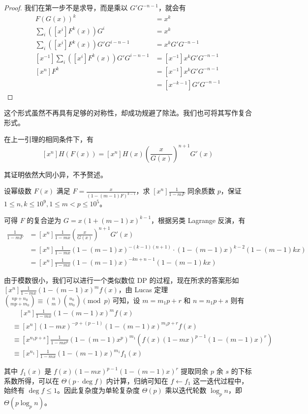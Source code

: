 \begin{proof} 我们在第一步不是求导，而是乘以 $G'G^{-n-1}$，就会有
\begin{align*}
F(G(x))^k &= x^k\\
\sum_i ([x^i]F^k(x))G^i &= x^k\\
\sum_i ([x^i]F^k(x))G'G^{i-n-1} &= x^k G'G^{-n-1}\\
[x^{-1}]\sum_i ([x^i]F^k(x))G'G^{i-n-1} &= [x^{-1}]x^k G'G^{-n-1}\\
[x^n]F^k &= [x^{-1}]x^k G'G^{-n-1}\\
&= [x^{-k-1}]G'G^{-n-1}
\end{align*}
\end{proof}

这个形式虽然不再具有足够的对称性，却成功规避了除法。我们也可将其写作复合形式。

\begin{lemma} 在上一引理的相同条件下，有
$$
[x^n] H(F(x)) = [x^n]H(x)\left(\frac{x}{G(x)}\right)^{n+1}G'(x)
$$
\end{lemma}

其证明依然大同小异，不予赘述。

\begin{problem}
设幂级数 $F(x)$ 满足 $F = \frac x{(1-(m-1)F)^{k-1}}$，求 $[x^n]\frac 1{1-mF}$ 同余质数 $p$，保证 $1\le n,k\le 10^9, 1\le m < p\le 10^5$。
\end{problem}

\begin{solution}
可得 $F$ 的复合逆为 $G=x(1+(m-1)x)^{k-1}$，根据另类 Lagrange 反演，有
\begin{align*}
[x^n] \frac 1{1-mF}
&= [x^n]\frac 1{1-mx}\left(\frac{x}{G(x)}\right)^{n+1}G'(x)\\
&= [x^n]\frac 1{1-mx}(1-(m-1)x)^{-(k-1)(n+1)} \cdot (1-(m-1)x)^{k-2}(1-(m-1)kx)\\
&= [x^n]\frac 1{1-mx}(1-(m-1)x)^{-kn+n-1}(1-(m-1)kx)
\end{align*}

由于模数很小，我们可以进行一个类似数位 DP 的过程，现在所求的答案形如 $[x^n] \frac 1{1-mx}(1-(m-1)x)^mf(x)$，由 Lucas 定理 $\binom {np+n_0}{mp+m_0} \equiv \binom n m\binom{n_0}{m_0} \pmod p$ 可知，设 $m=m_1p+r$ 和 $n=n_1p+s$ 则有
\begin{align*}
&\quad [x^n] \frac 1{1-mx}(1-(m-1)x)^mf(x)\\
&\equiv [x^n] (1-mx)^{-p+(p-1)}(1-(m-1)x)^{m_1p+r} f(x)\\
&\equiv [x^{n_1p+s}] \frac 1{1-mx^p}(1-(m-1)x^p)^{m_1} (f(x)(1-mx)^{p-1}(1-(m-1)x)^r)\\
&\equiv [x^{n_1}] \frac 1{1-mx}(1-(m-1)x)^{m_1} f_1(x)
\end{align*}

其中 $f_1(x)$ 是 $f(x)(1-mx)^{p-1}(1-(m-1)x)^r$ 提取同余 $p$ 余 $s$ 的下标系数所得，可以在 $\Theta(p\cdot \deg f)$ 内计算，归纳可知在 $f\leftarrow f_1$ 这一迭代过程中，始终有 $\deg f \le 1$。因此复杂度为单轮复杂度 $\Theta(p)$ 乘以迭代轮数 $\log_p n$，即 $\Theta(p\log_p n)$。
\end{solution}

